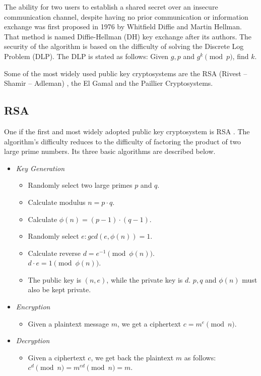 The ability for two users to establish a shared secret over an insecure communication channel, despite having no prior communication or information exchange was first proposed in 1976 by Whitfield Diffie and Martin Hellman.
That method is named Diffie-Hellman (DH) key exchange \cite{diffie1976new} after its authors. The security of the algorithm is based on the difficulty of solving the Discrete Log Problem (DLP). The DLP is stated as follows: Given $g, p$ and $g^k \pmod{p}$, find $k$.

Some of the most widely used public key cryptosystems are the RSA (Rivest -- Shamir -- Adleman) \cite{rivest1978method}, the El Gamal \cite{elgamal1985public} and the Paillier \cite{paillier1999public} Cryptosystems.

\subsection{RSA}\label{s:pk-rsa}

One if the first and most widely adopted public key cryptosystem is RSA . The algorithm's difficulty reduces to the difficulty of factoring the product of two large prime numbers. Its three basic algorithms are described below.

\begin{itemize}
  \item \textit{Key Generation}
  \begin{itemize}
    \item Randomly select two large primes $p$ and $q$.
    \item Calculate modulus $n = p \cdot q$.
    \item Calculate $\phi(n) = (p-1) \cdot (q-1)$.
    \item Randomly select $e : gcd(e,\phi(n)) = 1$.
    \item Calculate reverse $d  = e ^ {-1} \pmod{\phi(n)}$.\\
    $d \cdot e = 1 \pmod{\phi(n)}$.
    \item The public key is $(n, e)$, while the private key is $d$. $p, q$ and $\phi(n)$ must also be kept private.
  \end{itemize}
  \item \textit{Encryption}
  \begin{itemize}
    \item Given a plaintext message $m$, we get a ciphertext $c = m ^ e \pmod{n}$.
  \end{itemize}
  \item \textit{Decryption}
  \begin{itemize}
    \item Given a ciphertext $c$, we get back the plaintext $m$ as follows: $c^d \pmod{n} = m^{ed} \pmod{n} = m$.
  \end{itemize}
\end{itemize}



